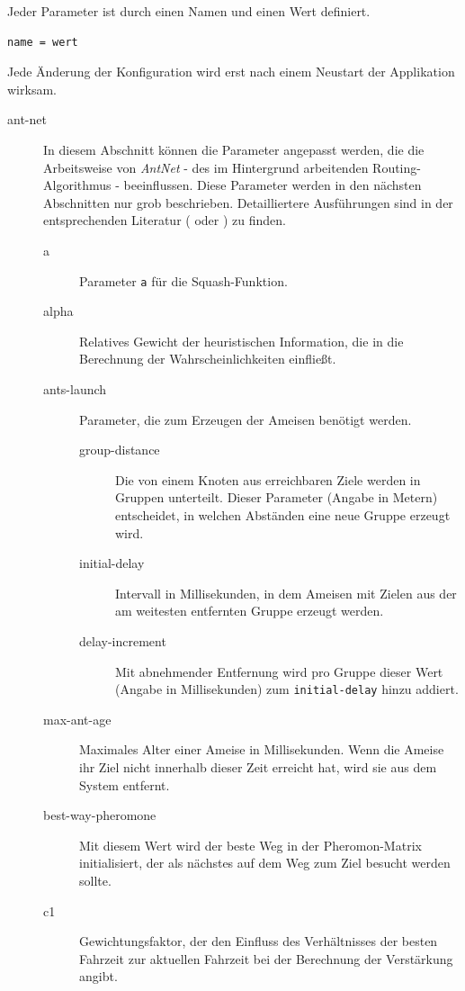 \documentclass[
  a4paper,
  10pt
]{scrreprt}
\begin{document}
Jeder Parameter ist durch einen Namen und einen Wert definiert.

\begin{lstlisting}
name = wert
\end{lstlisting}

Jede Änderung der Konfiguration wird erst nach einem Neustart der Applikation wirksam.

\begin{description}
  \item[ant-net] In diesem Abschnitt können die Parameter angepasst werden, die die Arbeitsweise von \textit{AntNet} - des im Hintergrund arbeitenden Routing-Algorithmus - beeinflussen.
    Diese Parameter werden in den nächsten Abschnitten nur grob beschrieben.
    Detailliertere Ausführungen sind in der entsprechenden Literatur (\cite{DorigoStuetzle2004} oder \cite{Walther2006}) zu finden.
    \begin{description}
      \item[a] Parameter \texttt{a} für die Squash-Funktion.
      \item[alpha] Relatives Gewicht der heuristischen Information, die in die Berechnung der Wahrscheinlichkeiten einfließt.
      \item[ants-launch] Parameter, die zum Erzeugen der Ameisen benötigt werden.
        \begin{description}
          \item[group-distance] Die von einem Knoten aus erreichbaren Ziele werden in Gruppen unterteilt.
            Dieser Parameter (Angabe in Metern) entscheidet, in welchen Abständen eine neue Gruppe erzeugt wird.
          \item[initial-delay] Intervall in Millisekunden, in dem Ameisen mit Zielen aus der am weitesten entfernten Gruppe erzeugt werden.
          \item[delay-increment] Mit abnehmender Entfernung wird pro Gruppe dieser Wert (Angabe in Millisekunden) zum \texttt{initial-delay} hinzu addiert.
        \end{description}
      \item[max-ant-age] Maximales Alter einer Ameise in Millisekunden.
        Wenn die Ameise ihr Ziel nicht innerhalb dieser Zeit erreicht hat, wird sie aus dem System entfernt.
      \item[best-way-pheromone] Mit diesem Wert wird der beste Weg in der Pheromon-Matrix initialisiert, der als nächstes auf dem Weg zum Ziel besucht werden sollte.
      \item[c1] Gewichtungsfaktor, der den Einfluss des Verhältnisses der besten Fahrzeit zur aktuellen Fahrzeit bei der Berechnung der Verstärkung angibt.

\end{description}
\end{description}
\end{document}
